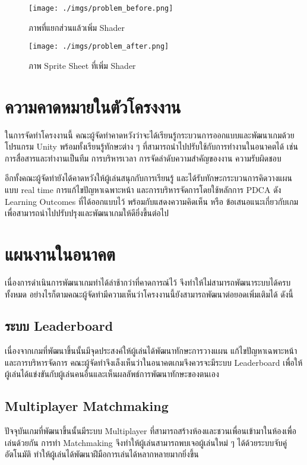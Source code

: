 \documentclass[12pt,oneside,openright,a4paper]{cpe-thai-project}
\begin{document}
    \begin{figure}[H]\centering
      \begin{minipage}{.4\textwidth}
        \centering
        \texttt{[image: ./imgs/problem\_before.png]}
        \caption{ภาพที่แยกส่วนแล้วเพิ่ม Shader}\label{fig:problem1}
      \end{minipage}
      \begin{minipage}{.4\textwidth}
        \centering
        \texttt{[image: ./imgs/problem\_after.png]}
        \caption{ภาพ Sprite Sheet ที่เพิ่ม Shader}\label{fig:solution1}
      \end{minipage}
    \end{figure}
  
  \section{ความคาดหมายในตัวโครงงาน}
  ในการจัดทำโครงงานนี้ คณะผู้จัดทำคาดหวังว่าจะได้เรียนรู้กระบวนการออกแบบและพัฒนาเกมด้วยโปรแกรม Unity 
  พร้อมทั้งเรียนรู้ทักษะต่าง ๆ ที่สามารถนำไปปรับใช้กับการทำงานในอนาคตได้ เช่น การสื่อสารและทำงานเป็นทีม 
  การบริหารเวลา การจัดลำดับความสำคัญของงาน ความรับผิดชอบ

  อีกทั้งคณะผู้จัดทำยังได้คาดหวังให้ผู้เล่นสนุกกับการเรียนรู้ และได้รับทักษะกระบวนการคิดวางแผนแบบ real time  
  การแก้ไขปัญหาเฉพาะหน้า และการบริหารจัดการโดยใช้หลักการ PDCA ดัง Learning Outcomes ที่ได้ออกแบบไว้ 
  พร้อมกับแสดงความคิดเห็น หรือ ข้อเสนอแนะเกี่ยวกับเกมเพื่อสามารถนำไปปรับปรุงและพัฒนาเกมให้ดียิ่งขึ้นต่อไป

  \pagebreak
  \section{แผนงานในอนาคต}
  เนื่องการดำเนินการพัฒนาเกมทำได้ล่าช้ากว่าที่คาดการณ์ไว้ จึงทำให้ไม่สามารถพัฒนาระบบได้ครบทั้งหมด 
  อย่างไรก็ตามคณะผู้จัดทำมีความเห็นว่าโครงงานนี้ยังสามารถพัฒนาต่อยอดเพิ่มเติมได้ ดังนี้

    \subsection{ระบบ Leaderboard}
    เนื่องจากเกมที่พัฒนาขึ้นนั้นมีจุดประสงค์ให้ผู้เล่นได้พัฒนาทักษะการวางแผน 
    แก้ไขปัญหาเฉพาะหน้าและการบริหารจัดการ คณะผู้จัดทำจึงเล็งเห็นว่าในอนาคตเกมจึงควรจะมีระบบ Leaderboard 
    เพื่อให้ผู้เล่นได้แข่งขันกับผู้เล่นคนอื่นและเห็นผลลัพธ์การพัฒนาทักษะของตนเอง

    \subsection{Multiplayer Matchmaking}
    ปัจจุบันเกมที่พัฒนาขึ้นนั้นมีระบบ Multiplayer ที่สามารถสร้างห้องและชวนเพื่อนเข้ามาในห้องเพื่อเล่นด้วยกัน 
    การทำ Matchmaking จึงทำให้ผู้เล่นสามารถพบเจอผู้เล่นใหม่ ๆ ได้ด้วยระบบจับคู่อัตโนมัติ 
    ทำให้ผู้เล่นได้พัฒนาฝีมือการเล่นได้หลากหลายมากยิ่งขึ้น
\end{document}
